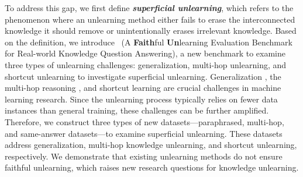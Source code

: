 To address this gap, we first define \textbf{\textit{superficial unlearning}}, which refers to the phenomenon where an unlearning method either fails to erase the interconnected knowledge it should remove or unintentionally erases irrelevant knowledge.
Based on the definition, we introduce \textbf{\ourdata}~(A \textbf{Faith}ful \textbf{Un}learning Evaluation Benchmark for Real-world Knowledge Question Answering), a new benchmark to examine three types of unlearning challenges: generalization, multi-hop unlearning, and shortcut unlearning to investigate superficial unlearning.
Generalization \citep{anil2022exploring, yang2024unveiling, albalak2024improving}, the multi-hop reasoning \citep{zhong2023mquake, li2024making, yang2024large}, and shortcut learning \citep{du2023shortcut, tang2023large, zhou2023explore} are crucial challenges in machine learning research.
Since the unlearning process typically relies on fewer data instances than general training, these challenges can be further amplified.
Therefore, we construct three types of new datasets—paraphrased, multi-hop, and same-answer datasets—to examine superficial unlearning.
These datasets address generalization, multi-hop knowledge unlearning, and shortcut unlearning, respectively.
We demonstrate that existing unlearning methods do not ensure faithful unlearning, which raises new research questions for knowledge unlearning.





